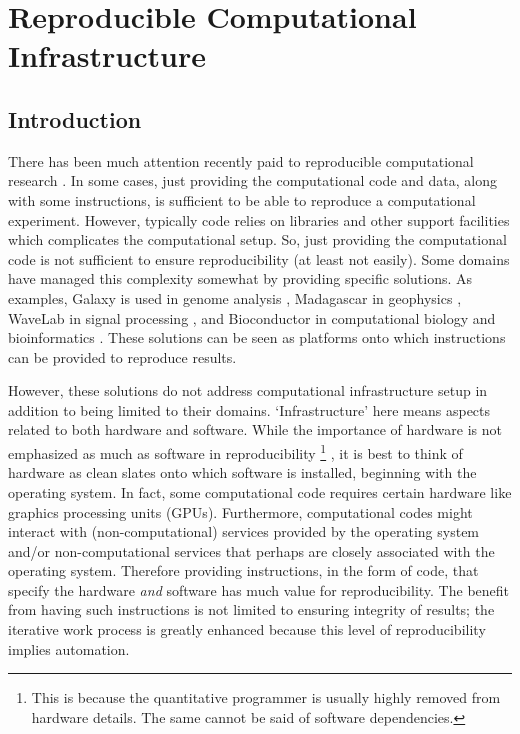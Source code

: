 \chapter[Reproducible Computational Infrastructure]{Reproducible Computational Infrastructure%
  \protect\footnotemark[1]%
}
\label{ch:pcc}

\section{Introduction}


There has been much attention recently paid to reproducible computational research \cite{Stodden2013}.
%
In some cases, just providing the computational code and data, along with some instructions, is sufficient to be able to reproduce a computational experiment.
%
However, typically code relies on libraries and other support facilities which complicates the computational setup.
%
So, just providing the computational code is not sufficient to ensure reproducibility (at least not easily).
%
Some domains have managed this complexity somewhat by providing specific solutions.
%
As examples, \textsf{Galaxy} is used in genome analysis \cite{Giardine2005},
%
\textsf{Madagascar} in geophysics \cite{Fomel2013},
%
\textsf{WaveLab} in signal processing \cite{Buckheit1995},
%
and \textsf{Bioconductor} in computational biology and bioinformatics \cite{Gentleman2004}.
%
These solutions can be seen as platforms onto which instructions can be provided to reproduce results.


However, these solutions do not address computational infrastructure setup in addition to being limited to their domains.
%
`Infrastructure' here means aspects related to both hardware and software.
%
While the importance of hardware is not emphasized as much as software in reproducibility%
\footnote{This is because the quantitative programmer is usually highly removed from hardware details. The same cannot be said of software dependencies.}%
,
it is best to think of hardware as clean slates onto which software is installed, beginning with the operating system.
%
In fact, some computational code requires certain hardware like graphics processing units (GPUs).
%
Furthermore, computational codes might interact with (non-computational) services provided by the operating system and/or non-computational services that perhaps are closely associated with the operating system.
%
Therefore providing instructions, in the form of code, that specify the hardware \emph{and} software has much value for reproducibility.
%
The benefit from having such instructions is not limited to ensuring integrity of results;
%
the iterative work process is greatly enhanced because this level of reproducibility implies automation.


